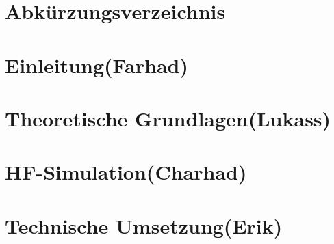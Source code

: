 \documentclass[a4paper, 11pt, oneside]{Thesis}  %
\begin{document}




%
%





\renewcommand{\contentsname}{Inhaltsverzeichnis}
\tableofcontents
\newpage

\chapter*{Abkürzungsverzeichnis}
\begin{acronym}[XXXXXX] %
\end{acronym}

\chapter{Einleitung(Farhad)}


\chapter{Theoretische Grundlagen(Lukass)}

\label{chapter:theoretische_grundlagen}

\chapter{HF-Simulation(Charhad)}

\label{chapter:hf_simulation}

\chapter{Technische Umsetzung(Erik)}

\end{document}

